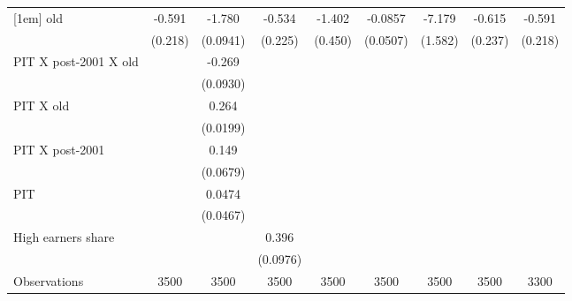 {\begin{tabular}{l*{8}{c}}
[1em]
old             &   -0.591\sym{***}&   -1.780\sym{***}&   -0.534\sym{**} &   -1.402\sym{***}&  -0.0857\sym{*}  &   -7.179\sym{***}&   -0.615\sym{***}&   -0.591\sym{***}\\
                &  (0.218)         & (0.0941)         &  (0.225)         &  (0.450)         & (0.0507)         &  (1.582)         &  (0.237)         &  (0.218)         \\
[1em]
PIT X post-2001 X old&                  &   -0.269\sym{***}&                  &                  &                  &                  &                  &                  \\
                &                  & (0.0930)         &                  &                  &                  &                  &                  &                  \\
[1em]
PIT X old       &                  &    0.264\sym{***}&                  &                  &                  &                  &                  &                  \\
                &                  & (0.0199)         &                  &                  &                  &                  &                  &                  \\
[1em]
PIT X post-2001 &                  &    0.149\sym{**} &                  &                  &                  &                  &                  &                  \\
                &                  & (0.0679)         &                  &                  &                  &                  &                  &                  \\
[1em]
PIT             &                  &   0.0474         &                  &                  &                  &                  &                  &                  \\
                &                  & (0.0467)         &                  &                  &                  &                  &                  &                  \\
[1em]
High earners share&                  &                  &    0.396\sym{***}&                  &                  &                  &                  &                  \\
                &                  &                  & (0.0976)         &                  &                  &                  &                  &                  \\
\hline
Observations    &     3500         &     3500         &     3500         &     3500         &     3500         &     3500         &     3500         &     3300         \\

\end{tabular}}
